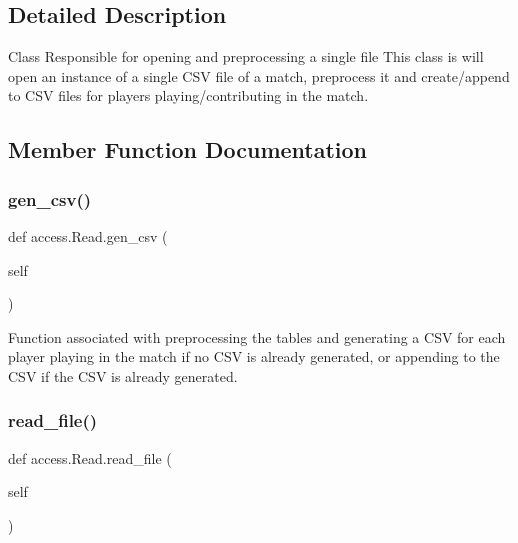 \subsection{Detailed Description}
Class Responsible for opening and preprocessing a single file This class is will open an instance of a single C\+SV file of a match, preprocess it and create/append to C\+SV files for players playing/contributing in the match. 



\subsection{Member Function Documentation}
\mbox{\label{classaccess_1_1Read_a9fbc3733d085156a8ee1ac59327483d1}} 
\subsubsection{\texorpdfstring{gen\+\_\+csv()}{gen\_csv()}}
{\footnotesize\ttfamily def access.\+Read.\+gen\+\_\+csv (\begin{DoxyParamCaption}\item[{}]{self }\end{DoxyParamCaption})}



Function associated with preprocessing the tables and generating a C\+SV for each player playing in the match if no C\+SV is already generated, or appending to the C\+SV if the C\+SV is already generated. 

\mbox{\label{classaccess_1_1Read_aeaf32257315cd5e6b99ce4bfef2d0bdb}} 
\subsubsection{\texorpdfstring{read\+\_\+file()}{read\_file()}}
{\footnotesize\ttfamily def access.\+Read.\+read\+\_\+file (\begin{DoxyParamCaption}\item[{}]{self }\end{DoxyParamCaption})}



